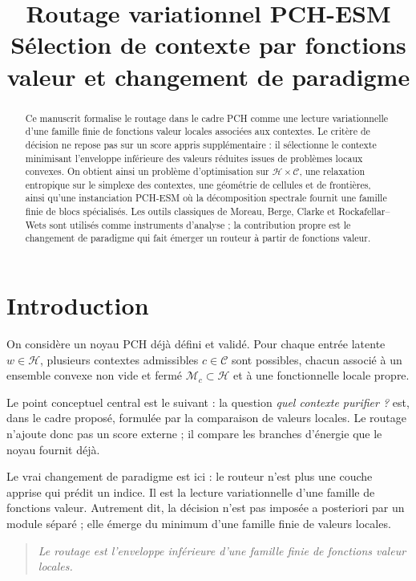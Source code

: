 \documentclass[11pt,a4paper]{article}
\title{Routage variationnel PCH-ESM\\
\large Sélection de contexte par fonctions valeur et changement de paradigme}
\author{}
\date{}
\newcommand{\Hh}{\mathcal H}
\newcommand{\Mcal}{\mathcal M}
\newcommand{\Ccal}{\mathcal C}
\begin{document}
\maketitle

\begin{abstract}
Ce manuscrit formalise le routage dans le cadre PCH comme une lecture variationnelle d'une famille finie de fonctions valeur locales associées aux contextes. Le critère de décision ne repose pas sur un score appris supplémentaire : il sélectionne le contexte minimisant l'enveloppe inférieure des valeurs réduites issues de problèmes locaux convexes. On obtient ainsi un problème d'optimisation sur \(\Hh\times\Ccal\), une relaxation entropique sur le simplexe des contextes, une géométrie de cellules et de frontières, ainsi qu'une instanciation PCH-ESM où la décomposition spectrale fournit une famille finie de blocs spécialisés. Les outils classiques de Moreau, Berge, Clarke et Rockafellar--Wets sont utilisés comme instruments d'analyse ; la contribution propre est le changement de paradigme qui fait émerger un routeur à partir de fonctions valeur.
\end{abstract}

\tableofcontents

\section{Introduction}

On considère un noyau PCH déjà défini et validé. Pour chaque entrée latente \(w\in\Hh\), plusieurs contextes admissibles \(c\in\Ccal\) sont possibles, chacun associé à un ensemble convexe non vide et fermé \(\Mcal_c\subset\Hh\) et à une fonctionnelle locale propre.

Le point conceptuel central est le suivant : la question \emph{quel contexte purifier ?} est, dans le cadre proposé, formulée par la comparaison de valeurs locales. Le routage n'ajoute donc pas un score externe ; il compare les branches d'énergie que le noyau fournit déjà.

Le vrai changement de paradigme est ici : le routeur n'est plus une couche apprise qui prédit un indice. Il est la lecture variationnelle d'une famille de fonctions valeur. Autrement dit, la décision n'est pas imposée a posteriori par un module séparé ; elle émerge du minimum d'une famille finie de valeurs locales.

\begin{quote}
\emph{Le routage est l'enveloppe inférieure d'une famille finie de fonctions valeur locales.}
\end{quote}
\end{document}
